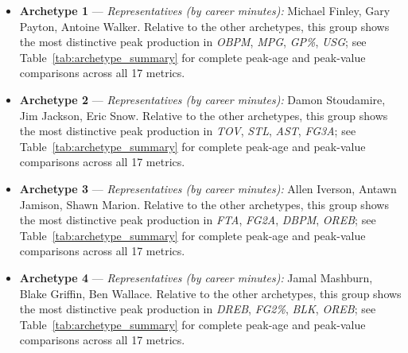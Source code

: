 \begin{itemize}
\item \textbf{Archetype 1} --- \emph{Representatives (by career minutes):} Michael Finley, Gary Payton, Antoine Walker. Relative to the other archetypes, this group shows the most distinctive peak production in \textit{OBPM}, \textit{MPG}, \textit{GP\%}, \textit{USG}; see Table~\ref{tab:archetype_summary} for complete peak-age and peak-value comparisons across all 17 metrics.
\item \textbf{Archetype 2} --- \emph{Representatives (by career minutes):} Damon Stoudamire, Jim Jackson, Eric Snow. Relative to the other archetypes, this group shows the most distinctive peak production in \textit{TOV}, \textit{STL}, \textit{AST}, \textit{FG3A}; see Table~\ref{tab:archetype_summary} for complete peak-age and peak-value comparisons across all 17 metrics.
\item \textbf{Archetype 3} --- \emph{Representatives (by career minutes):} Allen Iverson, Antawn Jamison, Shawn Marion. Relative to the other archetypes, this group shows the most distinctive peak production in \textit{FTA}, \textit{FG2A}, \textit{DBPM}, \textit{OREB}; see Table~\ref{tab:archetype_summary} for complete peak-age and peak-value comparisons across all 17 metrics.
\item \textbf{Archetype 4} --- \emph{Representatives (by career minutes):} Jamal Mashburn, Blake Griffin, Ben Wallace. Relative to the other archetypes, this group shows the most distinctive peak production in \textit{DREB}, \textit{FG2\%}, \textit{BLK}, \textit{OREB}; see Table~\ref{tab:archetype_summary} for complete peak-age and peak-value comparisons across all 17 metrics.
\end{itemize}
